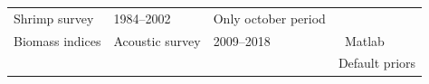 \documentclass[
]{article}
\begin{document}
\begin{longtable}[]{@{}llll@{}}
\begin{minipage}[t]{0.20\columnwidth}
Shrimp survey\strut
\end{minipage} & \begin{minipage}[t]{0.15\columnwidth}\raggedright
1984--2002\strut
\end{minipage} & \begin{minipage}[t]{0.33\columnwidth}\raggedright
Only october period\strut
\end{minipage}\tabularnewline
\begin{minipage}[t]{0.21\columnwidth}\raggedright
Biomass indices\strut
\end{minipage} & \begin{minipage}[t]{0.20\columnwidth}\raggedright
Acoustic survey\strut
\end{minipage} & \begin{minipage}[t]{0.15\columnwidth}\raggedright
2009--2018\strut
\end{minipage} & \begin{minipage}[t]{0.33\columnwidth}\raggedright
~Matlab\strut
\end{minipage}\tabularnewline
\begin{minipage}[t]{0.21\columnwidth}\raggedright
\strut
\end{minipage} & \begin{minipage}[t]{0.20\columnwidth}\raggedright
\strut
\end{minipage} & \begin{minipage}[t]{0.15\columnwidth}\raggedright
\strut
\end{minipage} & \begin{minipage}[t]{0.33\columnwidth}\raggedright
Default priors\strut
\end{minipage}\tabularnewline
\bottomrule
\end{longtable}
\end{document}
